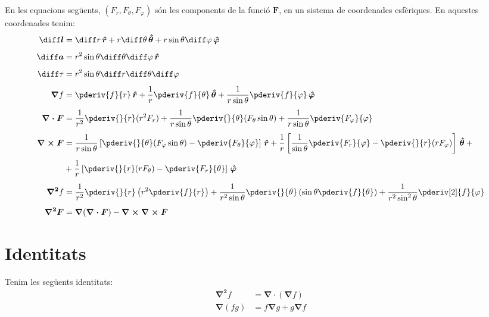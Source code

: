 \documentclass[catalan,a4paper,twoside,11pt]{article}
\begin{document}
\renewcommand{\va}{\ensuremath{\,\boldsymbol{\hat{r}}}}
\renewcommand{\vb}{\ensuremath{\,\boldsymbol{\hat{\theta}}}}
\renewcommand{\vc}{\ensuremath{\,\boldsymbol{\hat{\varphi}}}}
En les equacions seg\"{u}ents, $(F_r,F_\theta,F_\varphi)$  s\'{o}n
les components de la funci\'{o}  $\boldsymbol{F}$, en un sistema de
coordenades esf\`{e}riques. En aquestes coordenades tenim:
\begin{align}
    \boldsymbol{\diff l} &= \diff r \va + r\diff\theta \vb + r \sin\theta\diff \varphi \vc\\[1ex]
    \boldsymbol{\diff a} &= r^2 \sin\theta \diff \theta \diff \varphi \va\\[1ex]
    \diff\tau &= r^2 \sin\theta\diff r \diff \theta \diff \varphi\\[1ex]
    \boldsymbol{\nabla}f &= \pderiv{f}{r}\va + \frac{1}{r}\pderiv{f}{\theta}\vb
    + \frac{1}{r\sin\theta}\pderiv{f}{\varphi}\vc\\[1ex]
    \boldsymbol{\nabla\cdot F} &= \frac{1}{r^2}\pderiv{}{r}(r^2 F_r) +
    \frac{1}{r\sin\theta}\pderiv{}{\theta}(F_\theta\sin\theta)+
    \frac{1}{r\sin\theta}\pderiv{F_\varphi}{\varphi}\\[1ex]
    \boldsymbol{\nabla\times F} &= \frac{1}{r\sin\theta}\left[\pderiv{}{\theta}
    (F_\varphi\sin\theta)-\pderiv{F_\theta}{\varphi}\right]\va +
    \frac{1}{r}\left[\frac{1}{\sin\theta}\pderiv{F_r}{\varphi}-
    \pderiv{}{r}(r F_\varphi)\right]\vb +{} \nonumber \\[1ex]
     &+\frac{1}{r}\left[\pderiv{}{r}(r F_\theta)-\pderiv{F_r}{\theta}\right]\vc\\[1ex]
    \boldsymbol{\nabla^2}f &= \frac{1}{r^2}\pderiv{}{r}\left(r^2\pderiv{f}{r}
    \right) + \frac{1}{r^2\sin\theta}\pderiv{}{\theta}\left(\sin\theta\pderiv{f}{\theta}\right) +
    \frac{1}{r^2\sin^2\theta}\pderiv[2]{f}{\varphi}\\[1ex]
    \boldsymbol{\nabla^2F} &=\boldsymbol{\nabla}(\boldsymbol{\nabla\cdot
    F}) -\boldsymbol{\nabla\times\nabla\times F}
\end{align}

\section{Identitats }

Tenim les seg\"{u}ents identitats:
\begin{align}
    \boldsymbol{\nabla^2}f &=
    \boldsymbol{\nabla\cdot}(\boldsymbol{\nabla}f)\\[0.5ex]
    \boldsymbol{\nabla}(fg) &=
    f\boldsymbol{\nabla}g+g\boldsymbol{\nabla}f
\end{align}
\end{document}
